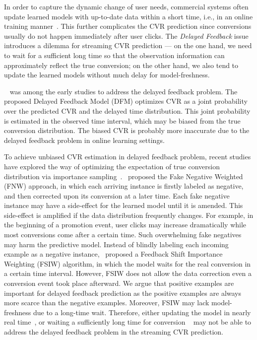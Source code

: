 \documentclass[letterpaper]{article} %
\begin{document}
In order to capture the dynamic change of user needs, commercial systems often update learned models with up-to-date data within a short time, i.e., in an online training manner~\cite{jugovac2018streamingrec,guo2019streaming,FNW}. This further complicates the CVR prediction since conversions usually do not happen immediately after user clicks. The \textit{Delayed Feedback} issue introduces a dilemma for streaming CVR prediction --- on the one hand, we need to wait for a sufficient long time so that the observation information can approximately reflect the true conversion; on the other hand, we also tend to update the learned models without much delay for model-freshness.

~\citet{DFM} was among the early studies to address the delayed feedback problem. The proposed Delayed Feedback Model (DFM) optimizes CVR as a joint probability over the predicted CVR and the delayed time distribution. This joint probability is estimated in the observed time interval, which may be biased from the true conversion distribution. The biased CVR is probably more inaccurate due to the delayed feedback problem in online learning settings.

To achieve unbiased CVR estimation in delayed feedback problem, recent studies have explored the way of optimizing the expectation of true conversion distribution via importance sampling~\cite{importance_weight}.~\citet{FNW} proposed the Fake Negative Weighted (FNW) approach, in which each arriving instance is firstly labeled as negative, and then corrected upon its conversion at a later time. Each fake negative instance may have a side-effect for the learned model until it is amended. This side-effect is amplified if the data distribution frequently changes. For example, in the beginning of a promotion event, user clicks may increase dramatically while most conversions come after a certain time. Such overwhelming fake negatives may harm the predictive model. Instead of blindly labeling each incoming example as a negative instance,~\citet{FSIW} proposed a Feedback Shift Importance Weighting (FSIW) algorithm, in which the model waits for the real conversion in a certain time interval. However, FSIW does not allow the data correction even a conversion event took place afterward. We argue that positive examples are important for delayed feedback prediction as the positive examples are always more scarce than the negative examples. Moreover, FSIW may lack model-freshness due to a long-time wait. Therefore, either updating the model in nearly real time~\cite{FNW}, or waiting a sufficiently long time for conversion ~\cite{FSIW} may not be able to address the delayed feedback problem in the streaming CVR prediction.
\end{document}
